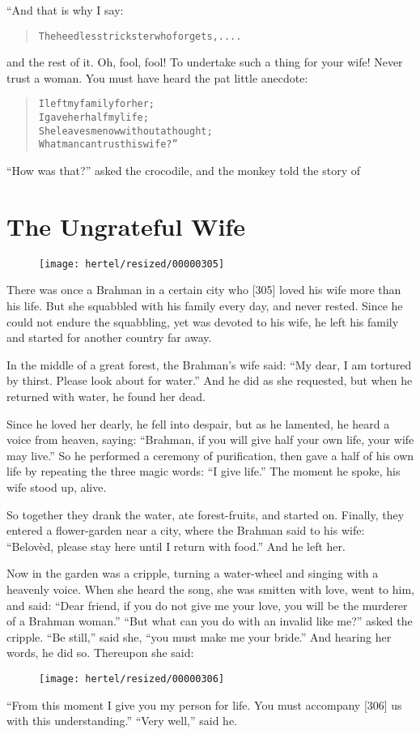 \documentclass[article, twoside, 10pt]{memoir}
\renewenvironment{verbatim}{%
\begin{quote}%
\vskip -10pt%
\begin{alltt}\normalfont\small}{\end{alltt}%
\end{quote}%
\vskip -10pt
} %
\begin{document}
“And that is why I say:

\begin{verbatim}
The heedless trickster who forgets, ....
\end{verbatim}
and the rest of it. Oh, fool, fool! To undertake such a thing for
your wife! Never trust a woman. You must have heard the pat little
anecdote:

\begin{verbatim}
I left my family for her;
    I gave her half my life;
She leaves me now without a thought;
    What man can trust his wife?”
\end{verbatim}
``How was that?'' asked the crocodile, and the monkey told the
story of

\chapter{The Ungrateful Wife}

\begin{figure}[p]\texttt{[image: hertel/resized/00000305]}\end{figure}There was once a Brahman in a certain city who [305] loved his wife
more than his life. But she squabbled with his family every day,
and never rested. Since he could not endure the squabbling, yet was
devoted to his wife, he left his family and started for another
country far away.

In the middle of a great forest, the Brahman's wife said:
``My dear, I am tortured by thirst. Please look about for water.''
And he did as she requested, but when he returned with water, he
found her dead.

Since he loved her dearly, he fell into despair, but as he
lamented, he heard a voice from heaven, saying:
``Brahman, if you will give half your own life, your wife may live.''
So he performed a ceremony of purification, then gave a half of his
own life by repeating the three magic words: ``I give life.'' The
moment he spoke, his wife stood up, alive.

So together they drank the water, ate forest-fruits, and started
on. Finally, they entered a flower-garden near a city, where the
Brahman said to his wife:
``Belovèd, please stay here until I return with food.'' And he left
her.

Now in the garden was a cripple, turning a water-wheel and singing
with a heavenly voice. When she heard the song, she was smitten
with love, went to him, and said:
``Dear friend, if you do not give me your love, you will be the murderer of a Brahman woman.''
``But what can you do with an invalid like me?'' asked the cripple.
``Be still,'' said she, ``you must make me your bride.'' And
hearing her words, he did so. Thereupon she said:
\begin{figure}[p]\texttt{[image: hertel/resized/00000306]}\end{figure}``From this moment I give you my person for life. You must accompany [306] us with this understanding.''
``Very well,'' said he.
\end{document}
